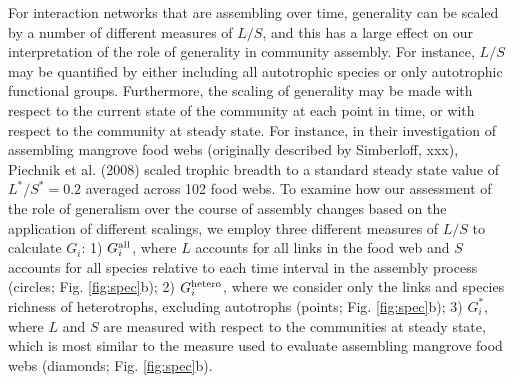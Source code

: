 \documentclass[twocolumn,preprintnumbers,amsmath,amssymb,superscriptaddress]{revtex4}
\newcommand{\rr}[1]{{\rm #1}}
\begin{document}
For interaction networks that are assembling over time, generality can be scaled by a number of different measures of $L/S$, and this has a large effect on our interpretation of the role of generality in community assembly.
For instance, $L/S$ may be quantified by either including all autotrophic species or only autotrophic functional groups.
Furthermore, the scaling of generality may be made with respect to the current state of the community at each point in time, or with respect to the community at steady state.
For instance, in their investigation of assembling mangrove food webs (originally described by Simberloff, xxx), Piechnik et al. (2008) scaled trophic breadth to a standard steady state value of $L^*/S^* = 0.2$ averaged across 102 food webs.
To examine how our assessment of the role of generalism over the course of assembly changes based on the application of different scalings, we employ three different measures of $L/S$ to calculate $G_i$:
1) $G_i^{\rr{all}}$, where $L$ accounts for all links in the food web and $S$ accounts for all species relative to each time interval in the assembly process (circles; Fig. \ref{fig:spec}b);
2) $G_i^{\rr{hetero}}$, where we consider only the links and species richness of heterotrophs, excluding autotrophs (points; Fig. \ref{fig:spec}b);
3) $G_i^*$, where $L$ and $S$ are measured with respect to the communities at steady state, which is most similar to the measure used to evaluate assembling mangrove food webs (diamonds; Fig. \ref{fig:spec}b).
\end{document}
